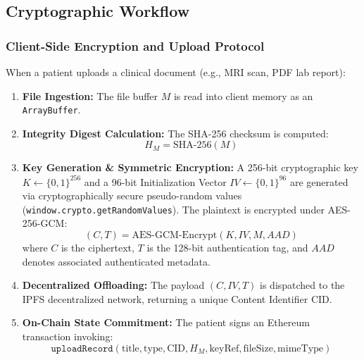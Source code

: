 \documentclass[11pt,a4paper]{article}
\begin{document}
\subsection{Cryptographic Workflow}

\subsubsection{Client-Side Encryption and Upload Protocol}
When a patient uploads a clinical document (e.g., MRI scan, PDF lab report):
\begin{enumerate}
    \item \textbf{File Ingestion:} The file buffer $M$ is read into client memory as an \texttt{ArrayBuffer}.
    \item \textbf{Integrity Digest Calculation:} The SHA-256 checksum is computed:
    \begin{equation}
        H_M = \text{SHA-256}(M)
    \end{equation}
    \item \textbf{Key Generation \& Symmetric Encryption:} A 256-bit cryptographic key $K \leftarrow \{0,1\}^{256}$ and a 96-bit Initialization Vector $IV \leftarrow \{0,1\}^{96}$ are generated via cryptographically secure pseudo-random values (\texttt{window.crypto.getRandomValues}). The plaintext is encrypted under AES-256-GCM:
    \begin{equation}
        (C, T) = \text{AES-GCM-Encrypt}(K, IV, M, AAD)
    \end{equation}
    where $C$ is the ciphertext, $T$ is the 128-bit authentication tag, and $AAD$ denotes associated authenticated metadata.
    \item \textbf{Decentralized Offloading:} The payload $(C, IV, T)$ is dispatched to the IPFS decentralized network, returning a unique Content Identifier $\text{CID}$.
    \item \textbf{On-Chain State Commitment:} The patient signs an Ethereum transaction invoking:
    \begin{equation}
        \texttt{uploadRecord}(\text{title}, \text{type}, \text{CID}, H_M, \text{keyRef}, \text{fileSize}, \text{mimeType})
    \end{equation}
\end{enumerate}
\end{document}

